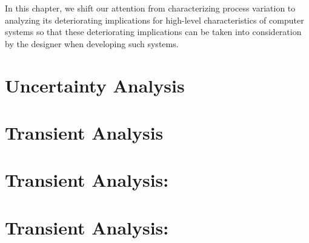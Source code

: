 In this chapter, we shift our attention from characterizing process variation to
analyzing its deteriorating implications for high-level characteristics of
computer systems so that these deteriorating implications can be taken into
consideration by the designer when developing such systems.

\section{\introductiontitle}

\section{\motivationtitle}

\section{\problemtitle}

\section{\priortitle}

\section{\solutiontitle}

\section{Uncertainty Analysis}

\section{Transient Analysis}

\section{Transient Analysis: \applicationtitle}

\section{Transient Analysis: \resultstitle}

